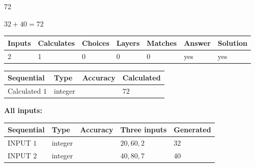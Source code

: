 \documentclass[12pt]{article}
\begin{document}
 

72
 
 
\noindent{}
 
 

 
 
 
\noindent{}
 
 

$ %
32 +  %
40=   %
72$
 
 
\noindent{}
 
 

 
   
   
   
   
\noindent\begin{tabular}{|l|l|l|l|l|l|l|}
 \hline
Inputs & Calculates & Choices & Layers & Matches & Answer & Solution \\ \hline
 2  & 
 1  & 
 0
  & 
 0  & 
 0  & 
  yes & 
  yes 
  \\ \hline
 \end{tabular}
   
   
   
   
\noindent{}
   
   
  
  
\noindent\begin{tabular}{|l|l|l|l|}
\hline
 Sequential & Type & Accuracy & Calculated \\ 
\hline
 
 
  Calculated $  1 $ & integer &  & 
  $ 72 $ 
 \\  \hline  
 \end{tabular}
   
   
   
   
\noindent\vspace{0.1in}\hspace{-0.08in} {\textbf{\Large{All inputs: }}}
   
   
  
  
\noindent\begin{tabular}{|l|l|l|l|l|}
\hline
 Sequential & Type & Accuracy & Three inputs & Generated \\ 
\hline
 
 
  INPUT $  1 $ & integer &  & $
 20
 , 
 60
 , 
 2
 $ & $ 32 $ 
 \\  \hline  
 
 
  INPUT $  2 $ & integer &  & $
 40
 , 
 80
 , 
 7
 $ & $ 40 $ 
 \\  \hline  
 \end{tabular}
   
\end{document}
